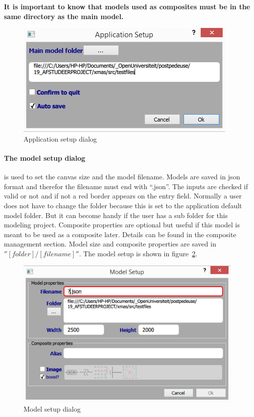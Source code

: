 \begin{tcolorbox}[colback=white]
\textbf{
It is important to know that models used as composites must be in the same
directory as the main model.
}
\end{tcolorbox}
   
\begin{figure}[t]
\begin{center}	
	\includegraphics[width=.70\linewidth]{pictures/app-setup}
	\caption{Application setup dialog}
	\label{fig:app-setup}
\end{center}
\end{figure}

\paragraph{The model setup dialog}is used to set the canvas size and the model
filename. Models are saved in json format and therefor the filename must end
with ``.json''. The inputs are checked if valid or not and if not a red border
appears on the entry field. Normally a user does not have to change the folder
because this is set to the application default model folder. But it can become
handy if the user has a sub folder for this modeling project. Composite
properties are optional but useful if this model is meant to be used as a
composite later. Details can be found in the composite management section. Model
size and composite properties are saved in $''[folder]/[filename]''$.
The model setup is shown in figure~\ref{fig:model-setup}.


\begin{figure}[here]
\begin{center}	
	\includegraphics[width=.70\linewidth]{pictures/model-setup}
	\caption{Model setup dialog}
	\label{fig:model-setup}
\end{center}
\end{figure}

